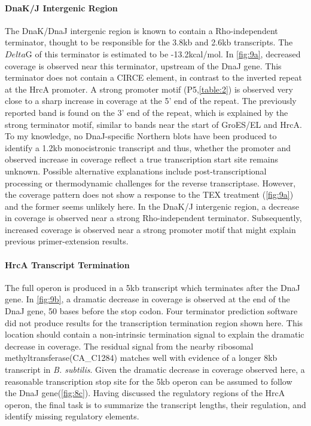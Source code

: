 \paragraph{DnaK/J Intergenic Region}
The DnaK/DnaJ intergenic region is known to contain a Rho-independent terminator\cite{80,81}, thought to be responsible for the 3.8kb and 2.6kb transcripts. The \(Delta\)G of this terminator is estimated to be -13.2kcal/mol. In \ref{fig:9a}, decreased coverage is observed near this terminator, upstream of the DnaJ gene. This terminator does not contain a CIRCE element, in contrast to the inverted repeat at the HrcA promoter. A strong promoter motif (P5,\ref{table:2}) is observed very close to a sharp increase in coverage at the 5' end of the repeat. The previously reported band is found on the 3' end of the repeat, which is explained by the strong terminator motif, similar to bands near the start of GroES/EL and HrcA. To my knowledge, no DnaJ-specific Northern blots have been produced to identify a 1.2kb monocistronic transcript and thus, whether the promoter and observed increase in coverage reflect a true transcription start site remains unknown. Possible alternative explanations include post-transcriptional processing or thermodynamic challenges for the reverse transcriptase\cite{80}. However, the coverage pattern does not show a response to the TEX treatment (\ref{fig:9a}) and the former seems unlikely here. In the DnaK/J intergenic region, a decrease in coverage is observed near a strong Rho-independent terminator. Subsequently, increased coverage is observed near a strong promoter motif that might explain previous primer-extension results\cite{80}.


\paragraph{HrcA Transcript Termination}
The full operon is produced in a 5kb transcript which terminates after the DnaJ gene. In \ref{fig:9b}, a dramatic decrease in coverage is observed at the end of the DnaJ gene, 50 bases before the stop codon. Four terminator prediction software did not produce results for the transcription termination region shown here. This location should contain a non-intrinsic termination signal to explain the dramatic decrease in coverage. The residual signal from the nearby ribosomal methyltransferase(CA_C1284) matches well with evidence of a longer 8kb transcript in \textit{B. subtilis}\cite{81}. Given the dramatic decrease in coverage observed here, a reasonable transcription stop site for the 5kb operon can be assumed to follow the DnaJ gene(\ref{fig:8c}). Having discussed the regulatory regions of the HrcA operon, the final task is to summarize the transcript lengths, their regulation, and identify missing regulatory elements.


